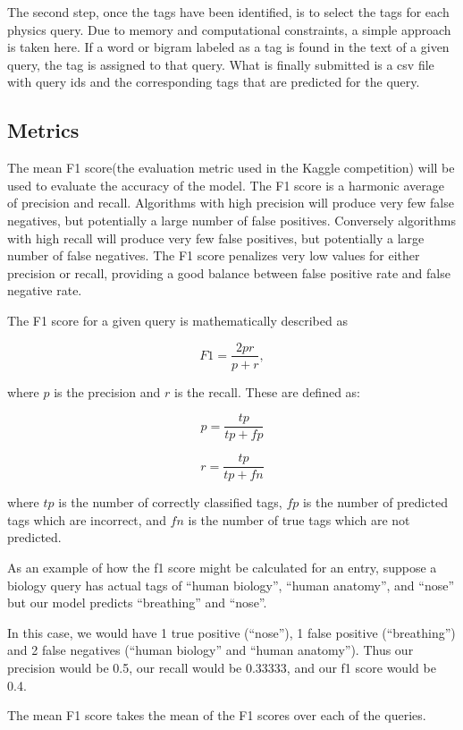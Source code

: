 \documentclass{article}
\def\eqstart{\begin{equation}}
\def\eqend{\end{equation}}
\begin{document}
The second step, once the tags have been identified, is to select the tags for
each physics query. Due to memory and computational constraints, a simple
approach is taken here. If a word or bigram labeled as a tag is found
in the text of a given query, the tag is assigned to that query. What is
finally submitted is a csv file with query ids and the corresponding tags that
are predicted for the query.

\subsection{Metrics}
\label{subsec:metrics}

The mean F1 score(the evaluation metric used in the Kaggle competition) will
be used to evaluate the accuracy of the model. The F1 score is a harmonic
average of precision and recall. Algorithms with high precision will produce
very few false negatives, but potentially a large number of false
positives. Conversely algorithms with high recall will produce very few false
positives, but potentially a large number of false negatives. The F1 score
penalizes very low values for either precision or recall, providing a good
balance between false positive rate and false negative rate.

The F1 score for a given query is mathematically described as

\eqstart
F1 = \frac{2 p r}{p + r},
\eqend

where \(p\) is the precision and \(r\) is the recall. These are defined as:

\eqstart
p = \frac{tp}{tp + fp}
\eqend

\eqstart
r = \frac{tp}{tp + fn}
\eqend

where \(tp\) is the number of correctly classified tags, \(fp\) is the number
of predicted tags which are incorrect, and \(fn\) is the number of true tags
which are not predicted.

As an example of how the f1 score might be calculated for an entry, suppose
a biology query has actual tags of ``human biology'', ``human anatomy'', and
``nose'' but our model predicts ``breathing'' and ``nose''.

In this case, we would have 1 true positive (``nose''), 1 false positive
(``breathing'') and 2 false negatives (``human biology'' and ``human
anatomy''). Thus our precision would be 0.5, our recall would be 0.33333, and
our f1 score would be 0.4.

The mean F1 score takes the mean of the F1 scores over each of the queries.
\end{document}
